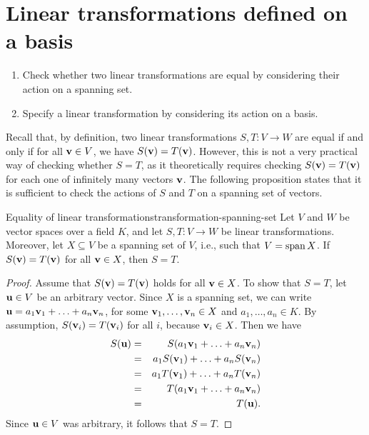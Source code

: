 \section{Linear transformations defined on a basis}

\begin{outcome}
  \begin{enumerate}
  \item Check whether two linear transformations are equal by
    considering their action on a spanning set.
  \item Specify a linear transformation by considering its action on a
    basis.
  \end{enumerate}
\end{outcome}

Recall that, by definition, two linear transformations $S,T:V\to W$
are equal if and only if for all $\vect{v}\in V$, we have
$S(\vect{v}) = T(\vect{v})$.  However, this is not a very practical
way of checking whether $S=T$, as it theoretically requires checking
$S(\vect{v}) = T(\vect{v})$ for each one of infinitely many vectors
$\vect{v}$. The following proposition states that it is sufficient to
check the actions of $S$ and $T$ on a spanning set of vectors.

\begin{proposition}{Equality of linear transformations}{transformation-spanning-set}
  Let $V$ and $W$ be vector spaces over a field $K$, and let
  $S,T:V\to W$ be linear transformations. Moreover, let $X\subseteq V$
  be a spanning set of $V$, i.e., such that $V=\sspan X$.
  If $S(\vect{v}) = T(\vect{v})$ for all $\vect{v}\in X$, then $S=T$.%
\end{proposition}

\begin{proof}
  Assume that $S(\vect{v}) = T(\vect{v})$ holds for all $\vect{v}\in X$. To
  show that $S=T$, let $\vect{u}\in V$ be an arbitrary vector. Since
  $X$ is a spanning set, we can write
  $\vect{u}=a_1\vect{v}_1+\ldots+a_n\vect{v}_n$, for some
  $\vect{v}_1,\ldots,\vect{v}_n\in X$ and $a_1,\ldots,a_n\in K$.
  By assumption, $S(\vect{v}_i) = T(\vect{v}_i)$ for all $i$, because
  $\vect{v}_i\in X$. Then we have
  \begin{eqnarray*}
    S(\vect{u})
    &=& S(a_1\vect{v}_1+\ldots+a_n\vect{v}_n) \\
    &=& a_1S(\vect{v}_1)+\ldots+a_nS(\vect{v}_n) \\
    &=& a_1T(\vect{v}_1)+\ldots+a_nT(\vect{v}_n) \\
    &=& T(a_1\vect{v}_1+\ldots+a_n\vect{v}_n) \\
    &=& T(\vect{u}).
  \end{eqnarray*}
  Since $\vect{u}\in V$ was arbitrary, it follows that $S=T$.
\end{proof}

